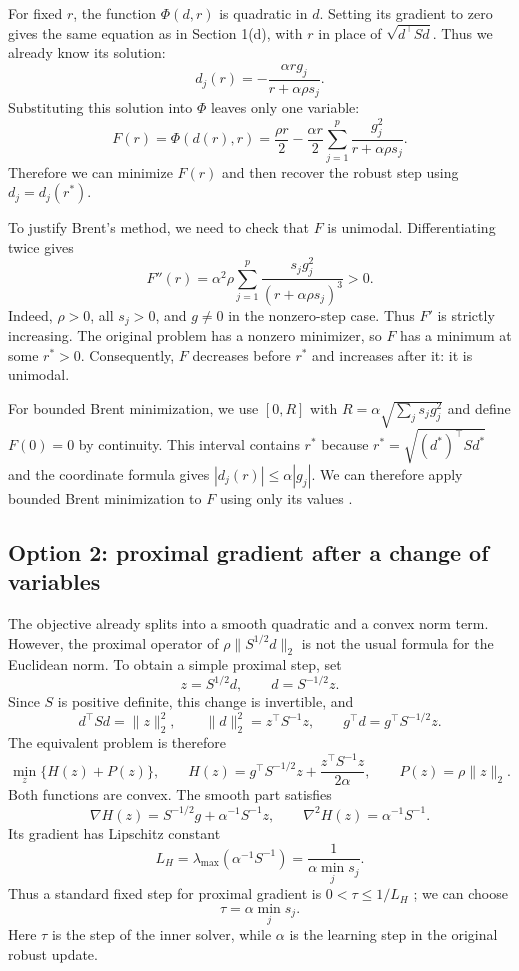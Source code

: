 \documentclass[11pt,a4paper]{article}
\begin{document}
For fixed $r$, the function $\Phi(d,r)$ is quadratic in $d$.
Setting its gradient to zero gives the same equation as in
Section 1(d), with $r$ in place of $\sqrt{d^\top Sd}$. Thus we already
know its solution:
\[
    d_j(r)=-\frac{\alpha r g_j}{r+\alpha\rho s_j}.
\]
Substituting this solution into $\Phi$ leaves only one variable:
\[
    F(r)=\Phi(d(r),r)
        =\frac{\rho r}{2}
         -\frac{\alpha r}{2}\sum_{j=1}^p
                   \frac{g_j^2}{r+\alpha\rho s_j}.
\]
Therefore we can minimize $F(r)$ and then recover the robust step
using $d_j=d_j(r^*)$.

To justify Brent's method, we need to check that $F$ is unimodal.
Differentiating twice gives
\[
    F''(r)=\alpha^2\rho\sum_{j=1}^p
              \frac{s_jg_j^2}{(r+\alpha\rho s_j)^3}>0.
\]
Indeed, $\rho>0$, all $s_j>0$, and $g\neq0$ in the nonzero-step case.
Thus $F'$ is strictly increasing. The original problem has a nonzero
minimizer, so $F$ has a minimum at some $r^*>0$. Consequently, $F$
decreases before $r^*$ and increases after it: it is unimodal.

For bounded Brent minimization, we use $[0,R]$ with
$R=\alpha\sqrt{\sum_j s_jg_j^2}$ and define $F(0)=0$ by continuity.
This interval contains $r^*$ because $r^*=\sqrt{(d^*)^\top Sd^*}$
and the coordinate formula gives $|d_j(r)|\leq\alpha|g_j|$.
We can therefore apply bounded Brent minimization to $F$ using only
its values \cite{scipy-brent}.

\subsection*{Option 2: proximal gradient after a change of variables}

The objective already splits into a smooth quadratic and a convex
norm term. However, the proximal operator of
$\rho\|S^{1/2}d\|_2$ is not the usual formula for the Euclidean norm.
To obtain a simple proximal step, set
\[
    z=S^{1/2}d,
    \qquad d=S^{-1/2}z.
\]
Since $S$ is positive definite, this change is invertible, and
\[
    d^\top Sd=\|z\|_2^2,
    \qquad \|d\|_2^2=z^\top S^{-1}z,
    \qquad g^\top d=g^\top S^{-1/2}z.
\]
The equivalent problem is therefore
\[
    \min_z\{H(z)+P(z)\},
    \qquad
    H(z)=g^\top S^{-1/2}z+\frac{z^\top S^{-1}z}{2\alpha},
    \qquad P(z)=\rho\|z\|_2.
\]
Both functions are convex. The smooth part satisfies
\[
    \nabla H(z)=S^{-1/2}g+\alpha^{-1}S^{-1}z,
    \qquad \nabla^2 H(z)=\alpha^{-1}S^{-1}.
\]
Its gradient has Lipschitz constant
\[
    L_H=\lambda_{\max}(\alpha^{-1}S^{-1})
       =\frac{1}{\alpha\min_j s_j}.
\]
Thus a standard fixed step for proximal gradient is
$0<\tau\leq1/L_H$ \cite[Section~4.2]{parikh-boyd}; we can choose
\[
    \tau=\alpha\min_j s_j.
\]
Here $\tau$ is the step of the inner solver, while $\alpha$ is the
learning step in the original robust update.
\end{document}
